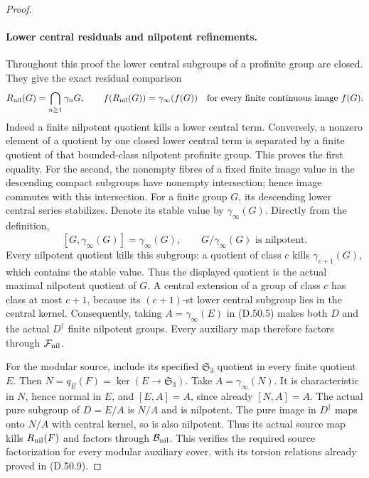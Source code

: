 \begin{proof}
\paragraph{Lower central residuals and nilpotent refinements.}
Throughout this proof the lower central subgroups of a profinite
group are closed. They give the exact residual comparison
\[
 R_{\rm nil}(G)=\bigcap_{n\geq1}\gamma_nG,\qquad
 f(R_{\rm nil}(G))=\gamma_\infty(f(G))
       \quad\text{for every finite continuous image }f(G).
\]
Indeed a finite nilpotent quotient kills a lower central term.
Conversely, a nonzero element of a quotient by one closed lower
central term is separated by a finite quotient of that bounded-class
nilpotent profinite group. This proves the first equality.
For the second, the nonempty fibres of a fixed finite image value
in the descending compact subgroups have nonempty intersection;
hence image commutes with this intersection.
For a finite group \(G\), its descending lower central
series stabilizes. Denote its stable value by
\(\gamma_\infty(G)\). Directly from the definition,
\[
 [G,\gamma_\infty(G)]=\gamma_\infty(G),\qquad
 G/\gamma_\infty(G)\text{ is nilpotent}.
 \tag{D.50.18}
\]
Every nilpotent quotient kills this subgroup: a quotient
of class \(c\) kills \(\gamma_{c+1}(G)\), which contains
the stable value. Thus the displayed quotient is the
actual maximal nilpotent quotient of \(G\).
A central extension of a group of class \(c\) has class
at most \(c+1\), because its \((c+1)\)-st lower central
subgroup lies in the central kernel. Consequently, taking
\(A=\gamma_\infty(E)\) in \textup{(D.50.5)} makes both
\(D\) and the actual \(D^\dagger\) finite nilpotent groups.
Every auxiliary map therefore factors through
\(\mathcal F_{\rm nil}\).

For the modular source, include its specified
\(\mathfrak S_3\) quotient in every finite quotient
\(E\). Then \(N=q_E(F)=\ker(E\to\mathfrak S_3)\).
Take \(A=\gamma_\infty(N)\). It is characteristic in
\(N\), hence normal in \(E\), and
\([E,A]=A\), since already \([N,A]=A\).
The actual pure subgroup of \(D=E/A\) is \(N/A\) and
is nilpotent. The pure image in \(D^\dagger\) maps
onto \(N/A\) with central kernel, so is also nilpotent.
Thus its actual source map kills \(R_{\rm nil}(F)\)
and factors through \(\mathcal B_{\rm nil}\).
This verifies the required source factorization for
every modular auxiliary cover, with its torsion
relations already proved in \textup{(D.50.9)}.


\end{proof}
